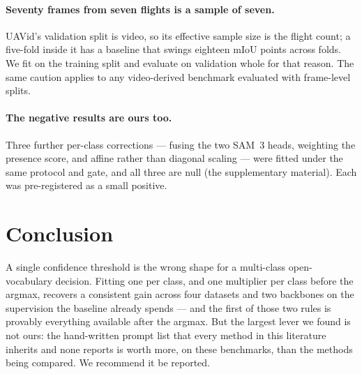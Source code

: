 \documentclass[10pt,twocolumn,letterpaper]{article}          %
\newcommand{\suppref}[1]{the supplementary material}
\begin{document}
\paragraph{Seventy frames from seven flights is a sample of seven.} UAVid's validation
split is video, so its effective sample size is the flight count; a five-fold inside it
has a baseline that swings eighteen mIoU points across folds. We fit on the training
split and evaluate on validation whole for that reason. The same caution applies to any
video-derived benchmark evaluated with frame-level splits.

\paragraph{The negative results are ours too.} Three further per-class corrections ---
fusing the two SAM~3 heads, weighting the presence score, and affine rather than
diagonal scaling --- were fitted under the same protocol and gate, and all three are
null (\suppref{sec:levers}). Each was pre-registered as a small positive.

\section{Conclusion}
\label{sec:conclusion}

A single confidence threshold is the wrong shape for a multi-class open-vocabulary
decision. Fitting one per class, and one multiplier per class before the argmax,
recovers a consistent gain across four datasets and two backbones on the supervision
the baseline already spends --- and the first of those two rules is provably
everything available after the argmax. But the largest lever we found is not ours: the
hand-written prompt list that every method in this literature inherits and none
reports is worth more, on these benchmarks, than the methods being compared. We
recommend it be reported.

{\small


}
\end{document}
